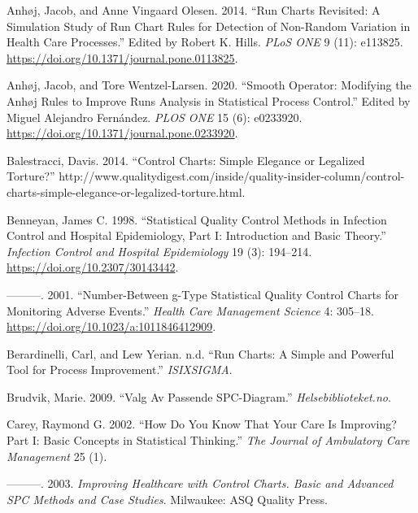 \documentclass[
]{book}
\newlength{\cslhangindent}
\newenvironment{CSLReferences}[2] %
 {%
  \setlength{\parindent}{0pt}
  \ifodd #1 \everypar{\setlength{\hangindent}{\cslhangindent}}\ignorespaces\fi
  \ifnum #2 > 0
  \setlength{\parskip}{#2\baselineskip}
  \fi
 }%
 {}
\begin{document}
\begin{CSLReferences}{1}{0}
\leavevmode{}%
Anhøj, Jacob, and Anne Vingaard Olesen. 2014. {``Run {Charts Revisited}: A {Simulation Study} of {Run Chart Rules} for {Detection} of {Non}-{Random Variation} in {Health Care Processes}.''} Edited by Robert K. Hills. \emph{PLoS ONE} 9 (11): e113825. \url{https://doi.org/10.1371/journal.pone.0113825}.

\leavevmode{}%
Anhøj, Jacob, and Tore Wentzel-Larsen. 2020. {``Smooth Operator: Modifying the {Anhøj} Rules to Improve Runs Analysis in Statistical Process Control.''} Edited by Miguel Alejandro Fernández. \emph{PLOS ONE} 15 (6): e0233920. \url{https://doi.org/10.1371/journal.pone.0233920}.

\leavevmode{}%
Balestracci, Davis. 2014. {``Control {Charts}: Simple {Elegance} or {Legalized Torture}?''} http://www.qualitydigest.com/inside/quality-insider-column/control-charts-simple-elegance-or-legalized-torture.html.

\leavevmode{}%
Benneyan, James C. 1998. {``Statistical Quality Control Methods in Infection Control and Hospital Epidemiology, Part {I}: Introduction and Basic Theory.''} \emph{Infection Control and Hospital Epidemiology} 19 (3): 194--214. \url{https://doi.org/10.2307/30143442}.

\leavevmode{}%
---------. 2001. {``Number-Between g-{Type} Statistical Quality Control Charts for Monitoring Adverse Events.''} \emph{Health Care Management Science} 4: 305--18. \url{https://doi.org/10.1023/a:1011846412909}.

\leavevmode{}%
Berardinelli, Carl, and Lew Yerian. n.d. {``Run Charts: A Simple and Powerful Tool for Process Improvement.''} \emph{ISIXSIGMA}.

\leavevmode{}%
Brudvik, Marie. 2009. {``Valg Av Passende {SPC}-Diagram.''} \emph{Helsebiblioteket.no}.

\leavevmode{}%
Carey, Raymond G. 2002. {``How Do You Know That Your Care Is Improving? Part {I}: Basic Concepts in Statistical Thinking.''} \emph{The Journal of Ambulatory Care Management} 25 (1).

\leavevmode{}%
---------. 2003. \emph{Improving Healthcare with Control Charts. {Basic} and Advanced {SPC} Methods and Case Studies}. {Milwaukee}: {ASQ Quality Press}.


\end{CSLReferences}
\end{document}
